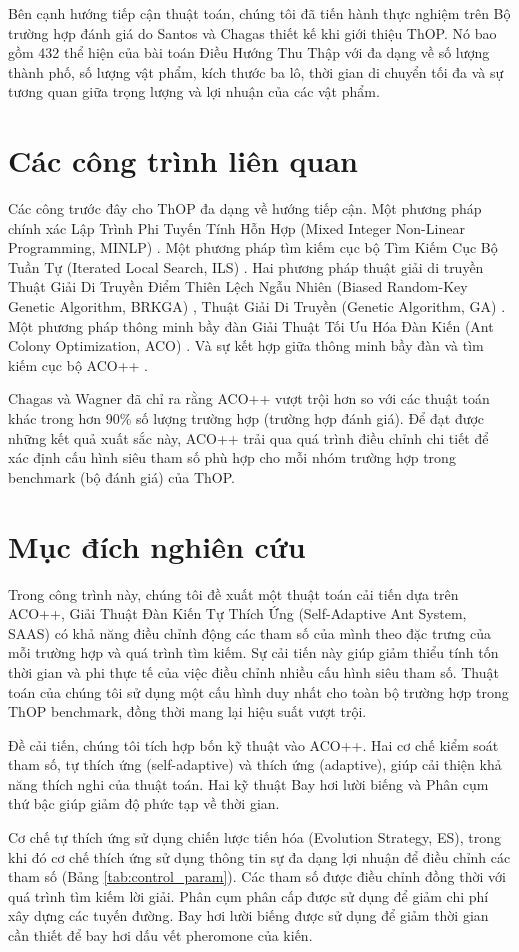 Bên cạnh hướng tiếp cận thuật toán, chúng tôi đã tiến hành thực nghiệm trên Bộ trường hợp đánh giá do Santos và Chagas thiết kế \cite{8477853} khi giới thiệu ThOP. Nó bao gồm 432 thể hiện của bài toán Điều Hướng Thu Thập với đa dạng về số lượng thành phố, số lượng vật phẩm, kích thước ba lô, thời gian di chuyển tối đa và sự tương quan giữa trọng lượng và lợi nhuận của các vật phẩm. 

\section{Các công trình liên quan}

Các công trước đây cho ThOP đa dạng về hướng tiếp cận. Một phương pháp chính xác Lập Trình Phi Tuyến Tính Hỗn Hợp (Mixed Integer Non-Linear Programming, MINLP) \cite{8477853}. Một phương pháp tìm kiếm cục bộ Tìm Kiếm Cục Bộ Tuần Tự (Iterated Local Search, ILS) \cite{8477853}. Hai phương pháp thuật giải di truyền Thuật Giải Di Truyền Điểm Thiên Lệch Ngẫu Nhiên (Biased Random-Key Genetic Algorithm, BRKGA) \cite{8477853}, Thuật Giải Di Truyền (Genetic Algorithm, GA) \cite{9185848}. Một phương pháp thông minh bầy đàn Giải Thuật Tối Ưu Hóa Đàn Kiến (Ant Colony Optimization, ACO) \cite{CHAGAS2020708}. Và sự kết hợp giữa thông minh bầy đàn và tìm kiếm cục bộ ACO++ \cite{Chagas2021}. 

Chagas và Wagner \cite{Chagas2021} đã chỉ ra rằng ACO++ vượt trội hơn so với các thuật toán khác trong hơn 90\% số lượng trường hợp (trường hợp đánh giá). Để đạt được những kết quả xuất sắc này, ACO++ trải qua quá trình điều chỉnh chi tiết để xác định cấu hình siêu tham số phù hợp cho mỗi nhóm trường hợp trong benchmark (bộ đánh giá) của ThOP.

\section{Mục đích nghiên cứu}

Trong công trình này, chúng tôi đề xuất một thuật toán cải tiến dựa trên ACO++, Giải Thuật Đàn Kiến Tự Thích Ứng (Self-Adaptive Ant System, SAAS) có khả năng điều chỉnh động các tham số của mình theo đặc trưng của mỗi trường hợp và quá trình tìm kiếm. Sự cải tiến này giúp giảm thiểu tính tốn thời gian và phi thực tế của việc điều chỉnh nhiều cấu hình siêu tham số. Thuật toán của chúng tôi sử dụng một cấu hình duy nhất cho toàn bộ trường hợp trong ThOP benchmark, đồng thời mang lại hiệu suất vượt trội.

Đề cải tiến, chúng tôi tích hợp bốn kỹ thuật vào ACO++. Hai cơ chế kiểm soát tham số, tự thích ứng (self-adaptive) và thích ứng (adaptive), giúp cải thiện khả năng thích nghi của thuật toán. Hai kỹ thuật Bay hơi lười biếng và Phân cụm thứ bậc giúp giảm độ phức tạp về thời gian.

Cơ chế tự thích ứng sử dụng chiến lược tiến hóa (Evolution Strategy, ES), trong khi đó cơ chế thích ứng sử dụng thông tin sự đa dạng lợi nhuận để điều chỉnh các tham số (Bảng \ref{tab:control_param}). Các tham số được điều chỉnh đồng thời với quá trình tìm kiếm lời giải. Phân cụm phân cấp được sử dụng để giảm chi phí xây dựng các tuyến đường. Bay hơi lười biếng được sử dụng để giảm thời gian cần thiết để bay hơi dấu vết pheromone của kiến.
